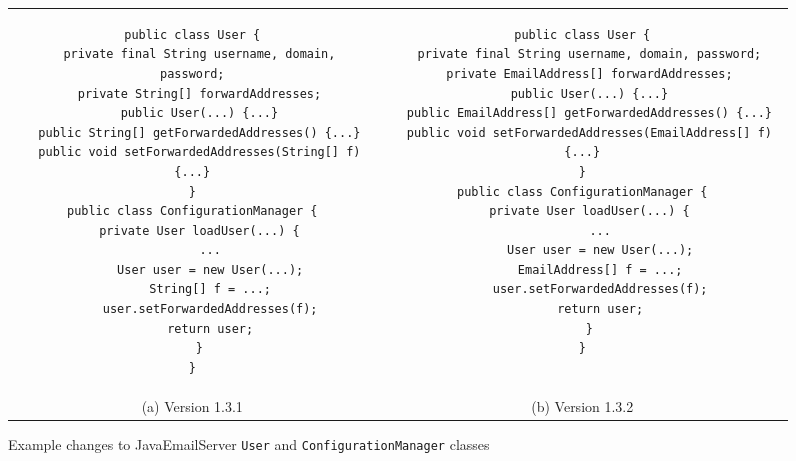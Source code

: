 \begin{figure*}[t]
\begin{tabular}{c|c}
\begin{minipage}{3.12in}
\begin{small}
\begin{verbatim}
public class User {
  private final String username, domain, password;
  private String[] forwardAddresses;
  public User(...) {...}
  public String[] getForwardedAddresses() {...}
  public void setForwardedAddresses(String[] f) {...}
}
public class ConfigurationManager {
  private User loadUser(...) {
     ...
     User user = new User(...);
     String[] f = ...;
     user.setForwardedAddresses(f);
     return user;
  }
}
\end{verbatim}
\end{small}
\end{minipage} &
\begin{minipage}{3.5in}
\begin{small}
\begin{verbatim}
public class User {
  private final String username, domain, password;
  private EmailAddress[] forwardAddresses;
  public User(...) {...}
  public EmailAddress[] getForwardedAddresses() {...}
  public void setForwardedAddresses(EmailAddress[] f) {...}
}
public class ConfigurationManager {
  private User loadUser(...) {
     ...
     User user = new User(...);
     EmailAddress[] f = ...;
     user.setForwardedAddresses(f);
     return user;
  }
}
\end{verbatim}
\end{small}
\end{minipage} \\
(a) Version 1.3.1 &
(b) Version 1.3.2 \\
\end{tabular}
\caption{Example changes to JavaEmailServer \texttt{User} and
  \texttt{ConfigurationManager} classes}
\label{fig:email-example}
\end{figure*}


